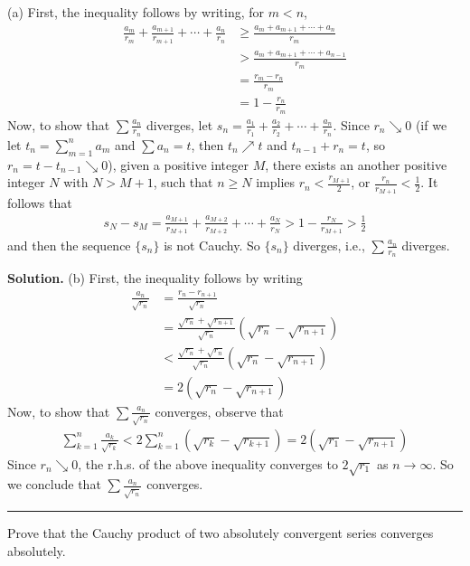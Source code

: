 \documentclass[12pt]{article}
\theoremstyle{definition}
\begin{document}
(a) First, the inequality follows by writing, for $m<n$,
\begin{align*}
\frac{a_m}{r_m}+\frac{a_{m+1}}{r_{m+1}}+\cdots+\frac{a_n}{r_n}
&\ge\frac{a_m+a_{m+1}+\cdots+a_n}{r_m} \\
&>\frac{a_m+a_{m+1}+\cdots+a_{n-1}}{r_m} \\
&=\frac{r_m-r_n}{r_m} \\
&=1-\frac{r_n}{r_m}
\end{align*}
Now, to show that $\sum \frac{a_n}{r_n}$ diverges, let $s_n=\frac{a_1}{r_1}+\frac{a_2}{r_2}+\cdots+\frac{a_n}{r_n}$. Since $r_n\searrow 0$ (if we let $t_n=\sum_{m=1}^na_m$ and $\sum a_n=t$, then $t_n\nearrow t$ and $t_{n-1}+r_n=t$, so $r_n=t-t_{n-1}\searrow 0$), given a positive integer $M$, there exists an another positive integer $N$ with $N>M+1$, such that $n\ge N$ implies $r_n<\frac{r_{M+1}}{2}$, or $\frac{r_n}{r_{M+1}}<\frac{1}{2}$. It follows that
\begin{align*}
s_N-s_M
=\frac{a_{M+1}}{r_{M+1}}+\frac{a_{M+2}}{r_{M+2}}+\cdots+\frac{a_N}{r_N}
>1-\frac{r_N}{r_{M+1}}
>\frac{1}{2}
\end{align*}
and then the sequence $\{s_n\}$ is not Cauchy. So $\{s_n\}$ diverges, i.e., $\sum\frac{a_n}{r_n}$ diverges.

\smallskip
\noindent\textbf{Solution.}\quad
(b) First, the inequality follows by writing
\begin{align*}
\frac{a_n}{\sqrt{r_n}}
&=\frac{r_{n}-r_{n+1}}{\sqrt{r_n}} \\
&=\frac{\sqrt{r_n}+\sqrt{r_{n+1}}}{\sqrt{r_n}}\left(\sqrt{r_n}-\sqrt{r_{n+1}}\right) \\
&<\frac{\sqrt{r_n}+\sqrt{r_n}}{\sqrt{r_n}}\left(\sqrt{r_n}-\sqrt{r_{n+1}}\right) \\
&=2\left(\sqrt{r_n}-\sqrt{r_{n+1}}\right)
\end{align*}
Now, to show that $\sum \frac{a_n}{\sqrt{r_n}}$ converges, observe that
\begin{align*}
\sum_{k=1}^n\frac{a_k}{\sqrt{r_k}}
<2\sum_{k=1}^n\left(\sqrt{r_k}-\sqrt{r_{k+1}}\right)
=2\left(\sqrt{r_1}-\sqrt{r_{n+1}}\right)
\end{align*}
Since $r_n\searrow 0$, the r.h.s. of the above inequality converges to $2\sqrt{r_1}$ as $n\to\infty$. So we conclude that $\sum\frac{a_n}{\sqrt{r_n}}$ converges.



\bigskip\noindent\hrule\bigskip

Prove that the Cauchy product of two absolutely convergent series converges absolutely.
\end{document}
